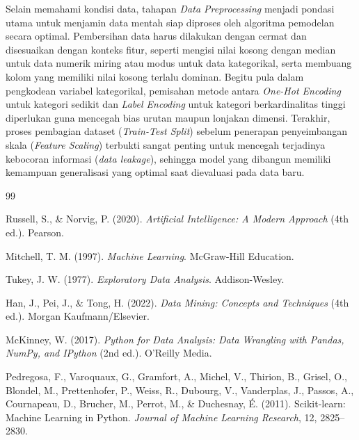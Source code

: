 \documentclass[a4paper,oneside,12pt]{report}
\begin{document}
Selain memahami kondisi data, tahapan \textit{Data Preprocessing} menjadi pondasi utama untuk menjamin data mentah siap diproses oleh algoritma pemodelan secara optimal. Pembersihan data harus dilakukan dengan cermat dan disesuaikan dengan konteks fitur, seperti mengisi nilai kosong dengan median untuk data numerik miring atau modus untuk data kategorikal, serta membuang kolom yang memiliki nilai kosong terlalu dominan. Begitu pula dalam pengkodean variabel kategorikal, pemisahan metode antara \textit{One-Hot Encoding} untuk kategori sedikit dan \textit{Label Encoding} untuk kategori berkardinalitas tinggi diperlukan guna mencegah bias urutan maupun lonjakan dimensi. Terakhir, proses pembagian dataset (\textit{Train-Test Split}) sebelum penerapan penyeimbangan skala (\textit{Feature Scaling}) terbukti sangat penting untuk mencegah terjadinya kebocoran informasi (\textit{data leakage}), sehingga model yang dibangun memiliki kemampuan generalisasi yang optimal saat dievaluasi pada data baru.

\clearpage

\begin{thebibliography}{99}

Russell, S., \& Norvig, P. (2020). \textit{Artificial Intelligence: A Modern Approach} (4th ed.). Pearson.

Mitchell, T. M. (1997). \textit{Machine Learning}. McGraw-Hill Education.

Tukey, J. W. (1977). \textit{Exploratory Data Analysis}. Addison-Wesley.

Han, J., Pei, J., \& Tong, H. (2022). \textit{Data Mining: Concepts and Techniques} (4th ed.). Morgan Kaufmann/Elsevier.

McKinney, W. (2017). \textit{Python for Data Analysis: Data Wrangling with Pandas, NumPy, and IPython} (2nd ed.). O'Reilly Media.

Pedregosa, F., Varoquaux, G., Gramfort, A., Michel, V., Thirion, B., Grisel, O., Blondel, M., Prettenhofer, P., Weiss, R., Dubourg, V., Vanderplas, J., Passos, A., Cournapeau, D., Brucher, M., Perrot, M., \& Duchesnay, É. (2011). Scikit-learn: Machine Learning in Python. \textit{Journal of Machine Learning Research}, 12, 2825--2830.

\end{thebibliography}
\end{document}
